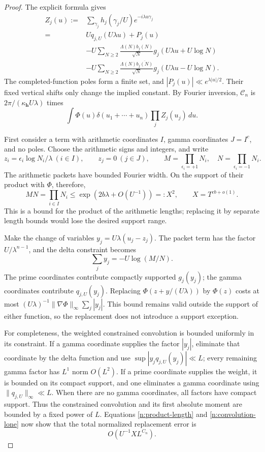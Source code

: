 \documentclass[11pt]{article}
\numberwithin{equation}{section}
\theoremstyle{remark}
\begin{document}
\begin{proof}
The explicit formula gives
\begin{equation}\label{n:EF-packets}
\begin{split}
 Z_j(u):={}&\sum_{\gamma_j}h_j(\gamma_j/U)e^{-i\lambda u\gamma_j}\\
 ={}&Uq_{j,U}(U\lambda u)+P_j(u)\\
 &-U\sum_{N\ge2}\frac{\Lambda(N)b_j(N)}{\sqrt N}
                      g_j(U\lambda u+U\log N)\\
 &-U\sum_{N\ge2}\frac{\Lambda(N)\overline{b_j(N)}}{\sqrt N}
                      g_j(U\lambda u-U\log N).
\end{split}
\end{equation}
The completed-function poles form a finite set, and
$|P_j(u)|\ll e^{\lambda|u|/2}$. Their fixed vertical shifts only
change the implied constant. By Fourier inversion,
$\mathcal C_n$ is $2\pi/(\kappa_{\boldsymbol h}U\lambda)$ times
\[
 \int\Phi(u)\delta(u_1+\cdots+u_n)\prod_jZ_j(u_j)\,du.
\]

First consider a term with arithmetic coordinates $I$, gamma
coordinates $J=I^c$, and no poles. Choose the arithmetic signs and
integers, and write
\[
 z_i=\epsilon_i\log N_i/\lambda\ (i\in I),\qquad
 z_j=0\ (j\in J),\qquad
 M=\prod_{\epsilon_i=+1}N_i,\quad
 N=\prod_{\epsilon_i=-1}N_i.
\]
The arithmetic packets have bounded Fourier width. On the support of
their product with $\Phi$, therefore,
\begin{equation}\label{n:product-length}
 MN=\prod_{i\in I}N_i
     \le \exp(2b\lambda+O(U^{-1}))=:X^2,\qquad
 X=T^{cb+o(1)}.
\end{equation}
This is a bound for the product of the arithmetic lengths; replacing
it by separate length bounds would lose the desired support range.

Make the change of variables
$y_j=U\lambda(u_j-z_j)$. The packet term has the factor
$U/\lambda^{n-1}$, and the delta constraint becomes
\[
 \sum_jy_j=-U\log(M/N).
\]
The prime coordinates contribute compactly supported $g_j(y_j)$;
the gamma coordinates contribute $q_{j,U}(y_j)$. Replacing
$\Phi(z+y/(U\lambda))$ by $\Phi(z)$ costs at most
$(U\lambda)^{-1}\|\nabla\Phi\|_\infty\sum_j|y_j|$.
This bound remains valid outside the support of either function, so
the replacement does not introduce a support exception.

For completeness, the weighted constrained convolution is bounded
uniformly in its constraint. If a gamma coordinate supplies the
factor $|y_j|$, eliminate that coordinate by the delta function and
use $\sup|y_jq_{j,U}(y_j)|\ll L$; every remaining gamma factor has
$L^1$ norm $O(L^2)$. If a prime coordinate supplies the weight, it is
bounded on its compact support, and one eliminates a gamma coordinate
using $\|q_{j,U}\|_\infty\ll L$. When there are no gamma coordinates,
all factors have compact support. Thus the constrained convolution
and its first absolute moment are bounded by a fixed power of $L$.
Equations \eqref{n:product-length} and \eqref{n:convolution-lone}
now show that the total normalized replacement error is
\begin{equation}\label{n:freeze-error}
 O\left(U^{-1}X L^{C_n}\right).
\end{equation}


\end{proof}
\end{document}
